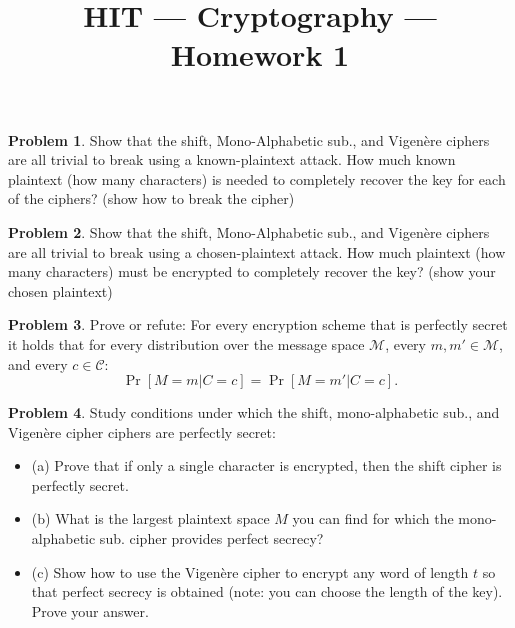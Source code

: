\documentclass[11pt]{article}
\title{HIT --- Cryptography --- Homework 1}
\theoremstyle{definition}
\newtheorem{problem}{Problem}
\begin{document}
\maketitle

\begin{problem}
Show that the shift, Mono-Alphabetic sub., and Vigen\`{e}re ciphers are all trivial to break using a known-plaintext attack. How much known plaintext (how many characters) is needed to completely recover the key for each of the ciphers?  (show how to break the cipher)
\end{problem}

\begin{problem}
Show that the shift, Mono-Alphabetic sub., and Vigen\`{e}re ciphers are all trivial to break using a chosen-plaintext attack. How much plaintext (how many characters) must be encrypted to completely recover the key? (show your chosen plaintext) 
\end{problem}

\begin{problem}
Prove or refute: For every encryption scheme that is perfectly secret it holds that for every distribution over the message space $\mathcal{M}$, every $m, m' \in \mathcal{M}$, and every $c \in \mathcal{C}$:
\[ \Pr[M=m | C=c] = \Pr[M=m'|C=c].
\]
\end{problem}

\begin{problem}
Study conditions under which the shift, mono-alphabetic sub., and Vigen\`{e}re cipher ciphers are perfectly secret:
\begin{itemize}
\item (a) Prove that if only a single character is encrypted, then the shift cipher is perfectly secret.
\item (b) What is the largest plaintext space $M$ you can find for which the mono-alphabetic sub. cipher provides perfect secrecy?
\item (c) Show how to use the Vigen\`{e}re cipher to encrypt any word of length $t$ so that perfect secrecy is obtained (note: you can choose the length of the key). Prove your answer.
\end{itemize}
\end{problem}
\end{document}
